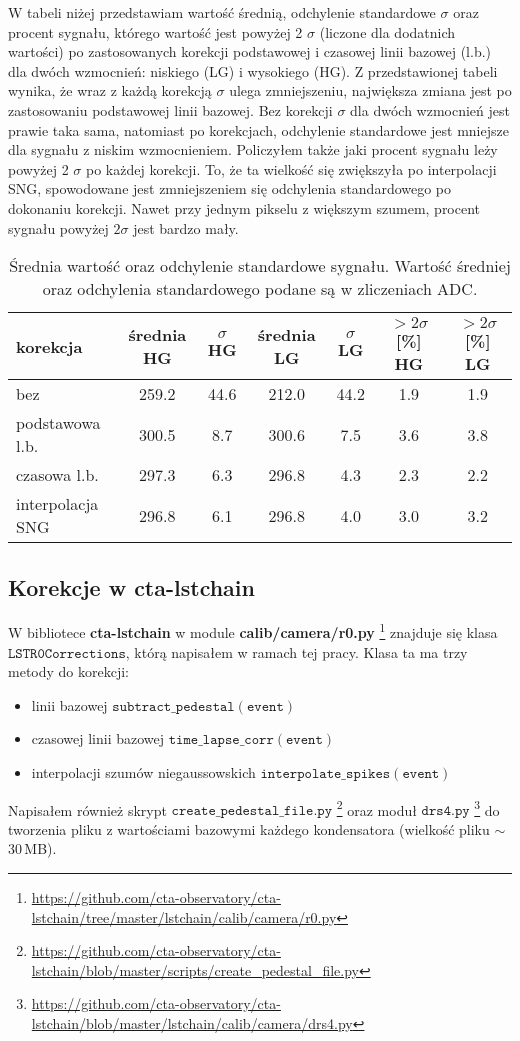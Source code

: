\documentclass[a4paper,11pt,twoside]{article}
\begin{document}
\newpage
W tabeli niżej przedstawiam wartość średnią, odchylenie standardowe $\sigma$ oraz procent sygnału, którego wartość jest powyżej 2 $\sigma$ (liczone dla dodatnich wartości) po zastosowanych korekcji podstawowej i czasowej linii bazowej (l.b.) dla dwóch wzmocnień: niskiego (LG) i wysokiego (HG). Z przedstawionej tabeli wynika, że wraz z każdą korekcją $\sigma$ ulega zmniejszeniu, największa zmiana jest po zastosowaniu podstawowej linii bazowej. Bez korekcji $\sigma$ dla dwóch wzmocnień jest prawie taka sama, natomiast po korekcjach, odchylenie standardowe jest mniejsze dla sygnału z niskim wzmocnieniem. Policzyłem także jaki procent sygnału leży powyżej 2 $\sigma$ po każdej korekcji.    
To, że ta wielkość się zwiększyła po interpolacji SNG, spowodowane jest zmniejszeniem się odchylenia standardowego po dokonaniu korekcji. Nawet przy jednym pikselu z większym szumem, procent sygnału powyżej $2 \sigma$ jest bardzo mały. 
\begin{table}[H]
\caption{Średnia wartość oraz odchylenie standardowe sygnału. Wartość średniej oraz odchylenia standardowego podane są w zliczeniach ADC.}
\begin{tabular}{|l|c|c|c|c|c|c|}
\hline
korekcja & średnia HG  & $\sigma$ HG  & średnia LG & $\sigma$ LG & $> 2 \sigma$ [\%] HG & $> 2 \sigma$ [\%] LG \\ \hline
bez  & 259.2  & 44.6  & 212.0 & 44.2 & 1.9 & 1.9  \\ \hline
podstawowa l.b. & 300.5  & 8.7  & 300.6 & 7.5 & 3.6 & 3.8    \\  \hline
czasowa l.b. & 297.3  & 6.3  & 296.8 & 4.3 & 2.3 & 2.2  \\  \hline
interpolacja SNG & 296.8  & 6.1 &  296.8 & 4.0 & 3.0 & 3.2  \\  \hline
\end{tabular}
\label{tab:std}
\end{table}
\subsection{Korekcje w cta-lstchain}
W bibliotece {\bf{cta-lstchain}} w module {\bf{calib/camera/r0.py}} \footnote{\url{https://github.com/cta-observatory/cta-lstchain/tree/master/lstchain/calib/camera/r0.py}} znajduje się klasa $\mathtt{LSTR0Corrections}$, którą napisałem w ramach tej pracy. Klasa ta ma trzy metody do korekcji:
\begin{itemize}
\item linii bazowej $\mathtt{subtract\_pedestal(event)}$
\item czasowej linii bazowej $\mathtt{time\_lapse\_corr(event)}$
\item interpolacji szumów niegaussowskich $\mathtt{interpolate\_spikes(event)}$
\end{itemize}
Napisałem również skrypt $\mathtt{create\_pedestal\_file.py}$ \footnote{\url{https://github.com/cta-observatory/cta-lstchain/blob/master/scripts/create_pedestal_file.py}} oraz moduł $\mathtt{drs4.py}$ \footnote{\url{https://github.com/cta-observatory/cta-lstchain/blob/master/lstchain/calib/camera/drs4.py}} do tworzenia pliku z wartościami bazowymi każdego kondensatora (wielkość pliku $\sim$30\,MB). 
\end{document}
